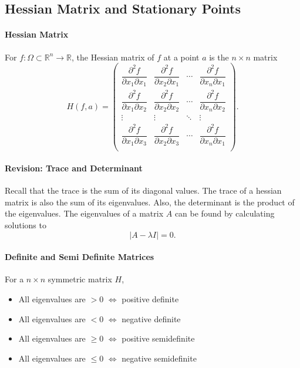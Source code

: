 \subsection{Hessian Matrix and Stationary Points}

\paragraph{Hessian Matrix}
For \(f: \Omega \subset \mathbb{R}^n \to \mathbb{R}\),
the Hessian matrix of \(f\) at a point \(a\) is the \(n\times n\)
matrix
\[
    H(f, a) =
    \begin{pmatrix}
        \dfrac{\partial^2 f}{\partial x_1 \partial x_1} & \dfrac{\partial^2 f}{\partial x_2 \partial x_1} & \cdots &\dfrac{\partial^2 f}{\partial x_n \partial x_1} \\
        \dfrac{\partial^2 f}{\partial x_1 \partial x_2} & \dfrac{\partial^2 f}{\partial x_2 \partial x_2} & \cdots &\dfrac{\partial^2 f}{\partial x_n \partial x_2} \\
        \vdots & \vdots & \ddots & \vdots \\
        \dfrac{\partial^2 f}{\partial x_1 \partial x_3} & \dfrac{\partial^2 f}{\partial x_2 \partial x_3} & \cdots &\dfrac{\partial^2 f}{\partial x_n \partial x_1} \\
    \end{pmatrix}.
\]

\paragraph{Revision: Trace and Determinant}
Recall that the trace is the sum of its diagonal values. The trace of a hessian
matrix is also the sum of its eigenvalues.
Also, the determinant is the product of the eigenvalues.
The eigenvalues of a matrix \(A\) can be found by calculating solutions to
\[\left| A - \lambda I\right| = 0.\]

\paragraph{Definite and Semi Definite Matrices}
For a \(n\times n\) symmetric matrix \(H\),
\begin{itemize}
    \item All eigenvalues are \(> 0\)    \(\Leftrightarrow\) positive definite
    \item All eigenvalues are \(< 0\)    \(\Leftrightarrow\) negative definite
    \item All eigenvalues are \(\geq 0\) \(\Leftrightarrow\) positive semidefinite
    \item All eigenvalues are \(\leq 0\) \(\Leftrightarrow\) negative semidefinite
\end{itemize}

